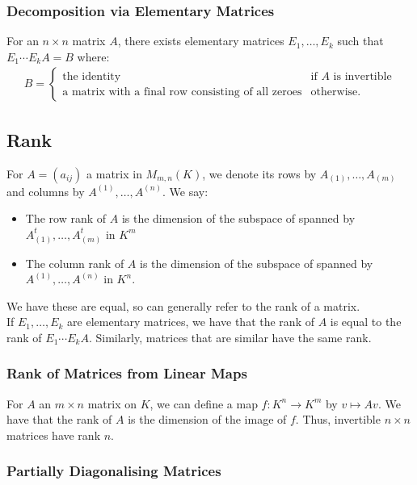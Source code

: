 \subsubsection{Decomposition via Elementary Matrices}

For an $n \times n$ matrix $A$, there exists elementary matrices
$E_1, \ldots, E_k$ such that $E_1\cdots E_kA = B$ where:
\begin{gather*}
  B = \begin{cases}
    \text{the identity} & \text{if $A$ is invertible} \\
    \text{a matrix with a final row consisting of all zeroes} & \text{otherwise.}
  \end{cases}
\end{gather*}

\subsection{Rank}

For $A = (a_{ij})$ a matrix in $M_{m,n}(K)$, we denote its rows by
$A_{(1)}, \ldots, A_{(m)}$ and columns by $A^{(1)}, \ldots, A^{(n)}$. We
say: \begin{itemize}
  \item The row rank of $A$ is the dimension of the subspace of spanned by 
  $A_{(1)}^t, \ldots, A_{(m)}^t$ in $K^m$
  \item The column rank of $A$ is the dimension of the subspace of spanned by 
  \newline $A^{(1)}, \ldots, A^{(n)}$ in $K^n$.
\end{itemize} We have these are equal, so can generally refer to the rank 
of a matrix.
\\[\baselineskip]
If $E_1, \ldots, E_k$ are elementary matrices, we have that the rank of $A$
is equal to the rank of $E_1\cdots E_kA$. Similarly, matrices that are similar 
have the same rank.

\subsubsection{Rank of Matrices from Linear Maps}

For $A$ an $m \times n$ matrix on $K$, we can define a map 
$f : K^n \to K^m$ by $v \mapsto Av$. We have that
the rank of $A$ is the dimension of the image of $f$.
Thus, invertible $n \times n$ matrices have rank $n$.

\subsubsection{Partially Diagonalising Matrices}

